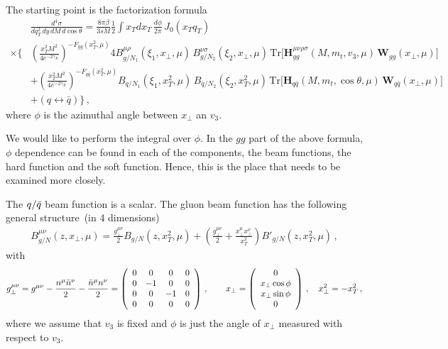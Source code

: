 \documentclass[a4paper,11pt]{report}
\numberwithin{equation}{section}
\begin{document}
The starting point is the factorization formula~\cite{Li:2013mia}
%
\begin{align}
  &\frac{d^4\sigma}{dq_T^2 \, dy \, dM \, d\cos\theta} = \frac{8\pi\beta}{3s
M} \frac{1}{2} \int x_Tdx_T \, \frac{d\phi}{2\pi} \, J_0(x_Tq_T) \, 
  \nonumber
  \\
  \times
  \bigg\{ 
  &\left( \frac{x_T^2M^2}{4e^{-2\gamma_E}} \right)^{-F_{gg}(x_T^2,\mu)} 4
B^{\mu\rho}_{g/N_1}(\xi_1,x_\perp,\mu) \,
B^{\nu\sigma}_{g/N_2}(\xi_2,x_\perp,\mu) \, \mathrm{Tr} \big[
\bm{H}^{\mu\nu\rho\sigma}_{gg}(M,m_t,v_3,\mu) \, \bm{W}_{gg}(x_\perp,\mu) \big]
  \nonumber
  \\
  &+ \left( \frac{x_T^2M^2}{4e^{-2\gamma_E}} \right)^{-F_{q\bar{q}}(x_T^2,\mu)}
B_{q/N_1}(\xi_1,x_T^2,\mu) \, B_{\bar{q}/N_2}(\xi_2,x_T^2,\mu) \, \mathrm{Tr}
\big[ \bm{H}_{q\bar{q}}(M,m_t,\cos\theta,\mu) \, \bm{W}_{q\bar{q}}(x_\perp,\mu)
\big] \nonumber
  \\
  &+ (q \leftrightarrow \bar{q}) \bigg\} \, ,
  \label{eq:factorization-scet}
\end{align}
%
where $\phi$ is the azimuthal angle between $x_\perp$ an $v_3$.

We would like to perform the integral over $\phi$.
In the $gg$ part of the above formula, $\phi$ dependence can be found in
each of the components, \ie the beam functions, the hard function and the soft
function. Hence, this is the place that needs to be examined more closely.

The $q/{\bar q}$ beam function is a scalar. The gluon beam function has the
following general structure~(in 4 dimensions)
%
\begin{align}
  B^{\mu\nu}_{g/N}(z,x_\perp,\mu) = \frac{g_\perp^{\mu\nu}}{2}
  B_{g/N}(z,x_T^2,\mu) + \left(\frac{g_\perp^{\mu\nu}}{2} + \frac{x_\perp^\mu
  x_\perp^\nu}{x_T^2} \right) B'_{g/N}(z,x_T^2,\mu) \,,
  \label{eq:beam-function-lorentz}
\end{align}
%
with
%
\begin{equation}
  g^{\mu\nu}_\perp = 
  g^{\mu\nu} - \frac{n^\mu \bar{n}^\nu}{2} - \frac{\bar{n}^\mu n^\nu}{2} =
  \left(
    \begin{array}{cccc}
      0 &  0 &  0 & 0 \\
      0 & -1 &  0 & 0 \\
      0 &  0 & -1 & 0 \\
      0 &  0 &  0 & 0
    \end{array}
  \right)\,,
  \qquad
  x_\perp = 
  \left(
    \begin{array}{c}
      0  \\
      x_\perp \cos\phi  \\
      x_\perp \sin\phi  \\
      0 
    \end{array}
  \right)\,,
  \quad
  x_\perp^2 = -x_T^2\,,
\end{equation}
%
where we assume that $v_3$ is fixed and $\phi$ is just the angle of $x_\perp$
measured with respect to $v_3$.
\end{document}
